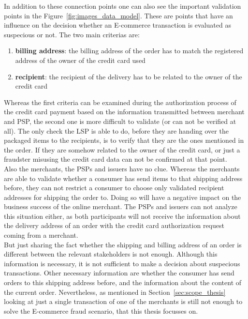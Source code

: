In addition to these connection points one can also see the important validation points in the Figure~\ref{fig:images_data_model}. These are points that have an influence on the decision whether an \gls{E-commerce} transaction is evaluated as suspecious or not. The two main criterias are: \@

\begin{enumerate}
  \item \textbf{billing address}: the billing address of the order has to match the registered address of the owner of the credit card used
  \item \textbf{recipient}: the recipient of the delivery has to be related to the owner of the credit card
\end{enumerate}


Whereas the first criteria can be examined during the authorization process of the credit card payment based on the information transmitted between merchant and \gls{PSP}, the second one is more difficult to validate (or can not be verified at all). The only check the \gls{LSP} is able to do, before they are handing over the packaged items to the recipients, is to verify that they are the ones mentioned in the order. If they are somehow related to the owner of the credit card, or just a fraudster misusing the credit card data can not be confirmed at that point. \\

Also the merchants, the \gls{PSP}s and issuers have no clue. Whereas the merchants are able to validate whether a consumer has send items to that shipping address before, they can not restrict a consumer to choose only validated recipient addresses for shipping the order to. Doing so will have a negative impact on the business success of the online merchant. The \gls{PSP}s and issuers can not analyze this situation either, as both participants will not receive the information about the delivery address of an order with the credit card authorization request coming from a merchant. \\

But just sharing the fact whether the shipping and billing address of an order is different between the relevant stakeholders is not enough. Although this information is necessary, it is not sufficient to make a decision about suspecious transactions. Other necessary information are whether the consumer has send orders to this shipping address before, and the information about the content of the current order. Nevertheless, as mentioned in Section~\ref{sec:scope_thesis} looking at just a single transaction of one of the merchants is still not enough to solve the \gls{E-commerce} fraud scenario, that this thesis focusses on. \\

